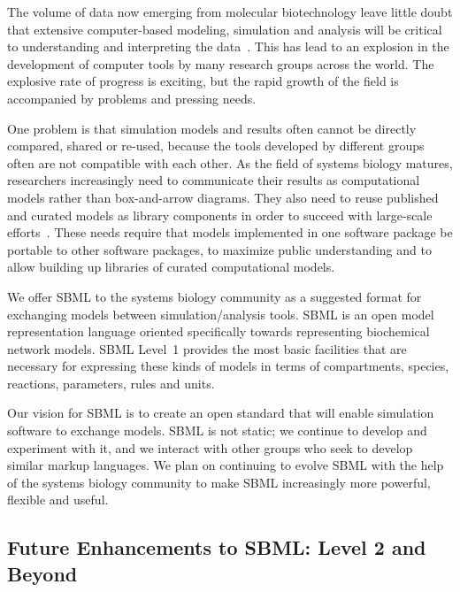 \documentclass[10pt]{cekarticle}
\begin{document}
The volume of data now emerging from molecular biotechnology
leave little doubt that extensive computer-based modeling, simulation and
analysis will be critical to understanding and interpreting the
data~\citep{abbott:1999,gilman:2000,popel:1998,smaglik:2000}.  This
has lead to an explosion in the development of computer tools by many
research groups across the world.  The explosive rate of progress is
exciting, but the rapid growth of the field is accompanied by problems and
pressing needs.

One problem is that simulation models and results often cannot be directly
compared, shared or re-used, because the tools developed by different
groups often are not compatible with each other.  As the field of systems
biology matures, researchers increasingly need to communicate their results
as computational models rather than box-and-arrow diagrams.  They also need
to reuse published and curated models as library components in order to
succeed with large-scale efforts~\cite[e.g., the Alliance for Cellular
Signaling;][]{gilman:2000,smaglik:2000}.  These needs require that models
implemented in one software package be portable to other software packages,
to maximize public understanding and to allow building up libraries of
curated computational models.

We offer SBML to the systems biology community as a suggested format for
exchanging models between simulation/analysis tools.  SBML is an open model
representation language oriented specifically towards representing
biochemical network models.  SBML Level~1 provides the most basic
facilities that are necessary for expressing these kinds of models in terms
of compartments, species, reactions, parameters, rules and units.

Our vision for SBML is to create an open standard that will enable
simulation software to exchange models.  SBML is not static; we continue to
develop and experiment with it, and we interact with other groups who seek
to develop similar markup languages.  We plan on continuing to evolve SBML
with the help of the systems biology community to make SBML increasingly
more powerful, flexible and useful.


\subsection{Future Enhancements to SBML: Level 2 and Beyond}
\label{sec:level-2}
\end{document}
